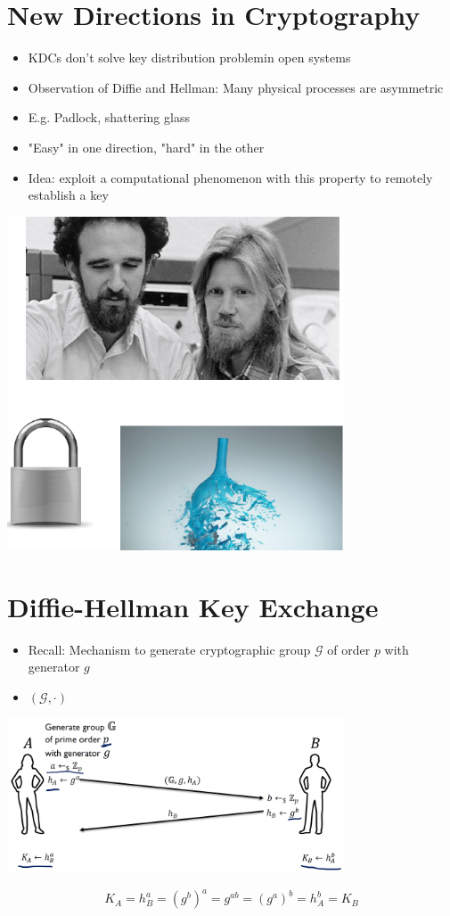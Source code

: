 \section{New Directions in Cryptography}
	\begin{itemize}
		\item KDCs don’t solve key distribution problemin open systems
		\item Observation of Diffie and Hellman: Many physical processes are asymmetric
		\item E.g. Padlock, shattering glass
		\item "Easy" in one direction, "hard" in the other
		\item Idea: exploit a computational phenomenon with this property to remotely establish a key
	\end{itemize}
	\begin{center}
		\includegraphics[width=100mm]{Graphics/Key Distribution and Key Exchange/kdke3.png}
	\end{center}

\section{Diffie-Hellman Key Exchange}
	\begin{itemize}
		\item Recall: Mechanism to generate cryptographic group $\mathcal{G}$ of order $p$ with generator $g$
		\item $(\mathcal{G},\cdot)$
	\end{itemize}
	\begin{center}
		\includegraphics[width=100mm]{Graphics/Key Distribution and Key Exchange/kdke4.png}
	\end{center}
	$$K_A = h^a_B = (g^b)^a = g^{ab} = (g^a)^b = h^b_A = K_B$$

